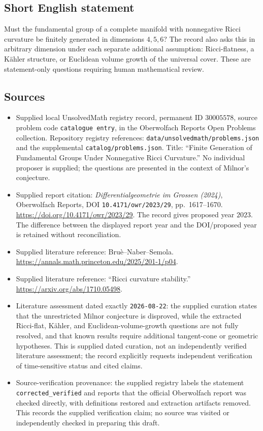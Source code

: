 \documentclass[11pt]{article}
\begin{document}
\subsection{Short English statement}
Must the fundamental group of a complete manifold with nonnegative Ricci curvature be finitely generated in dimensions \(4,5,6\)? The record also asks this in arbitrary dimension under each separate additional assumption: Ricci-flatness, a Kähler structure, or Euclidean volume growth of the universal cover. These are statement-only questions requiring human mathematical review.
\subsection{Sources}
\begin{itemize}
\item Supplied local UnsolvedMath registry record, permanent ID \(30005578\), source problem code \texttt{catalogue entry}, in the Oberwolfach Reports Open Problems collection. Repository registry references: \texttt{data/unsolvedmath/problems.json} and the supplemental \texttt{catalog/problems.json}. Title: ``Finite Generation of Fundamental Groups Under Nonnegative Ricci Curvature.'' No individual proposer is supplied; the questions are presented in the context of Milnor's conjecture.
\item Supplied report citation: \emph{Differentialgeometrie im Grossen (2024)}, Oberwolfach Reports, DOI \texttt{10.4171/owr/2023/29}, pp.\ 1617--1670. \url{https://doi.org/10.4171/owr/2023/29}. The record gives proposed year \(2023\). The difference between the displayed report year and the DOI/proposed year is retained without reconciliation.
\item Supplied literature reference: Bruè--Naber--Semola. \url{https://annals.math.princeton.edu/2025/201-1/p04}.
\item Supplied literature reference: ``Ricci curvature stability.'' \url{https://arxiv.org/abs/1710.05498}.
\item Literature assessment dated exactly \texttt{2026-08-22}: the supplied curation states that the unrestricted Milnor conjecture is disproved, while the extracted Ricci-flat, Kähler, and Euclidean-volume-growth questions are not fully resolved, and that known results require additional tangent-cone or geometric hypotheses. This is supplied dated curation, not an independently verified literature assessment; the record explicitly requests independent verification of time-sensitive status and cited claims.
\item Source-verification provenance: the supplied registry labels the statement \texttt{corrected\_verified} and reports that the official Oberwolfach report was checked directly, with definitions restored and extraction artifacts removed. This records the supplied verification claim; no source was visited or independently checked in preparing this draft.
\end{itemize}
\end{document}
